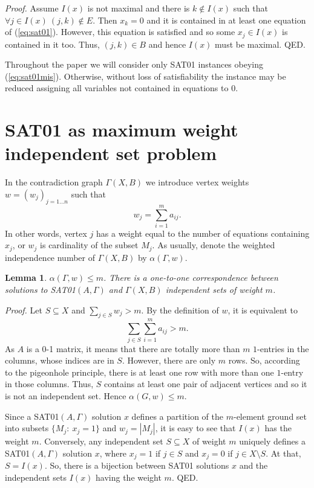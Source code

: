 \documentclass[11pt]{article}
\newtheorem{lem}{Lemma}
\begin{document}
{\em Proof.\/} Assume $I(x)$ is not maximal and there is $k \notin I(x)$ such that $\forall j \in I(x) \ (j,k) \notin E$. Then $x_k=0$ and it is contained in at least one equation of (\ref{eq:sat01}). However, this equation is satisfied and so some $x_j \in I(x)$ is contained in it too. Thus, $(j,k) \in B$ and hence $I(x)$ must be maximal. QED.

Throughout the paper we will consider only SAT01 instances obeying (\ref{eq:sat01mis}). Otherwise, without loss of satisfiability the instance may be reduced assigning all variables not contained in equations to $0$.

\section{SAT01 as maximum weight independent set problem}
In the contradiction graph $\Gamma(X,B)$ we introduce vertex weights $w=(w_j)_{j=1 \ldots n}$ such that
\begin{equation}
\label{eq:sat01w}
w_j = \sum_{i=1}^m a_{ij}.
\end{equation}
In other words, vertex $j$ has a weight equal to the number of equations containing $x_j$, or $w_j$ is cardinality of the subset $M_j$. As usually, denote the weighted independence number of $\Gamma(X,B)$ by $\alpha(\Gamma,w)$.
\begin{lem}
$\alpha(\Gamma,w) \le m$. There is a one-to-one correspondence between solutions to SAT01$(A,\Gamma)$ and $\Gamma(X,B)$ independent sets of weight $m$.
\end{lem}

{\em Proof.\/} Let $S \subseteq X$ and $\sum_{j \in S} w_j >m$. By the definition of $w$, it is equivalent to
\[ \sum_{j \in S} \sum_{i=1}^m a_{ij} >m. \]
As $A$ is a 0-1 matrix, it means that there are totally more than $m$ $1$-entries in the columns, whose indices are in $S$. However, there are only $m$ rows. So, according to the pigeonhole principle, there is at least one row with more than one $1$-entry in those columns. Thus, $S$ contains at least one pair of adjacent vertices and so it is not an independent set. Hence $\alpha(G,w) \le m$.

Since a SAT01$(A,\Gamma)$ solution $x$ defines a partition of the $m$-element ground set into subsets $\{M_j: \ x_j=1\}$ and $w_j=|M_j|$, it is easy to see that $I(x)$ has the weight $m$. Conversely, any independent set $S \subseteq X$ of weight $m$ uniquely defines a SAT01$(A,\Gamma)$ solution $x$, where $x_j=1$ if $j \in S$ and $x_j=0$ if $j \in X \setminus S$. At that, $S=I(x)$. So, there is a bijection between SAT01 solutions $x$ and the independent sets $I(x)$ having the weight $m$. QED.
\end{document}
